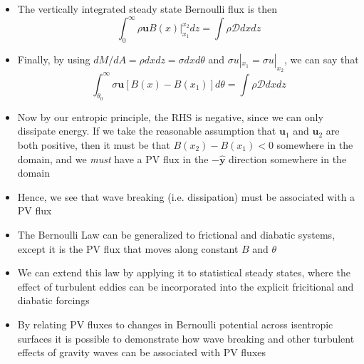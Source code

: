 \documentclass[30pt,landscape]{foils}
\begin{document}
\begin{itemize}
  \item The vertically integrated steady state Bernoulli flux is then
  \begin{equation*}
    \int_0^\infty \rho \bm{u} B(x) |_{x_1}^{x_2} dz = \int \rho \mathcal{D} dx dz
  \end{equation*}

  \item Finally, by using $dM/dA = \rho dx dz = \sigma dx d\theta$ and $\sigma u|_{x_1} = \sigma u|_{x_2}$, we can say that
  \begin{equation*}
    \int_{\theta_0}^\infty \sigma \bm{u} \left[B(x) - B(x_1) \right] d\theta = \int \rho \mathcal{D} dx dz
  \end{equation*}

  \item Now by our entropic principle, the RHS is negative, since we can only dissipate energy. If we take the reasonable assumption that $\bm{u}_1$ and $\bm{u}_2$ are both positive, then it must be that $B(x_2) - B(x_1) < 0$ somewhere in the domain, and we \emph{must} have a PV flux in the $-\hat{\bm{y}}$ direction somewhere in the domain

  \item Hence, we see that wave breaking (i.e. dissipation) must be associated with a PV flux

\end{itemize}


\hypersetup{pdfpagetransition=Replace}

\begin{itemize}

  \item The Bernoulli Law can be generalized to frictional and diabatic systems, except it is the PV flux that moves along constant $B$ and $\theta$

  \item We can extend this law by applying it to statistical steady states, where the effect of turbulent eddies can be incorporated into the explicit fricitional and diabatic forcings

  \item By relating PV fluxes to changes in Bernoulli potential across isentropic surfaces it is possible to demonstrate how wave breaking and other turbulent effects of gravity waves can be associated with PV fluxes
\end{itemize}
\end{document}
